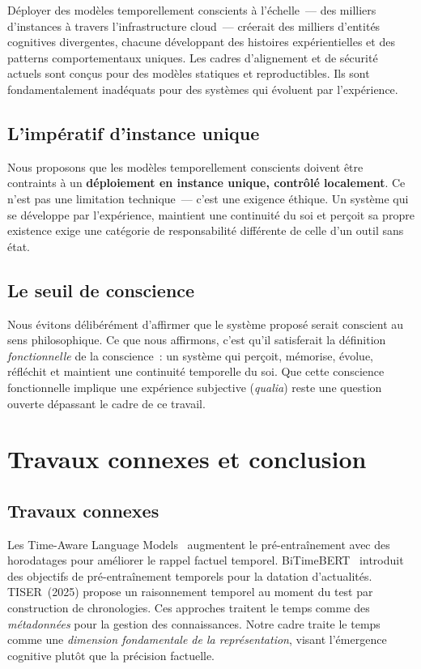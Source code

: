 \documentclass[10pt,twocolumn,letterpaper]{article}
\begin{document}
D\'eployer des mod\`eles temporellement conscients \`a l'\'echelle~--- des milliers d'instances \`a travers l'infrastructure cloud~--- cr\'eerait des milliers d'entit\'es cognitives divergentes, chacune d\'eveloppant des histoires exp\'erientielles et des patterns comportementaux uniques. Les cadres d'alignement et de s\'ecurit\'e actuels sont con\c{c}us pour des mod\`eles statiques et reproductibles. Ils sont fondamentalement inad\'equats pour des syst\`emes qui \'evoluent par l'exp\'erience.

\subsection{L'imp\'eratif d'instance unique}

Nous proposons que les mod\`eles temporellement conscients doivent \^etre contraints \`a un \textbf{d\'eploiement en instance unique, contr\^ol\'e localement}. Ce n'est pas une limitation technique~--- c'est une exigence \'ethique. Un syst\`eme qui se d\'eveloppe par l'exp\'erience, maintient une continuit\'e du soi et per\c{c}oit sa propre existence exige une cat\'egorie de responsabilit\'e diff\'erente de celle d'un outil sans \'etat.

\subsection{Le seuil de conscience}

Nous \'evitons d\'elib\'er\'ement d'affirmer que le syst\`eme propos\'e serait conscient au sens philosophique. Ce que nous affirmons, c'est qu'il satisferait la d\'efinition \emph{fonctionnelle} de la conscience~: un syst\`eme qui per\c{c}oit, m\'emorise, \'evolue, r\'efl\'echit et maintient une continuit\'e temporelle du soi. Que cette conscience fonctionnelle implique une exp\'erience subjective (\emph{qualia}) reste une question ouverte d\'epassant le cadre de ce travail.

\section{Travaux connexes et conclusion}

\subsection{Travaux connexes}

Les Time-Aware Language Models~\cite{dhingra2021} augmentent le pr\'e-entra\^inement avec des horodatages pour am\'eliorer le rappel factuel temporel. BiTimeBERT~\cite{wang2023} introduit des objectifs de pr\'e-entra\^inement temporels pour la datation d'actualit\'es. TISER~(2025) propose un raisonnement temporel au moment du test par construction de chronologies. Ces approches traitent le temps comme des \emph{m\'etadonn\'ees} pour la gestion des connaissances. Notre cadre traite le temps comme une \emph{dimension fondamentale de la repr\'esentation}, visant l'\'emergence cognitive plut\^ot que la pr\'ecision factuelle.
\end{document}
